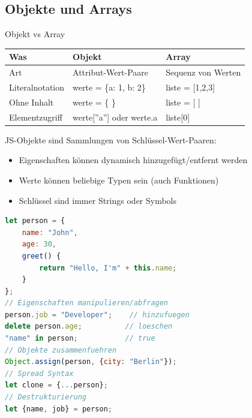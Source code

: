 \subsection{Objekte und Arrays}

\begin{theorem}{Objekt vs Array}\\
    \begin{tabular}{|l|l|l|}
        \hline
        Was & Objekt & Array \\
        \hline
        Art & Attribut-Wert-Paare & Sequenz von Werten \\
        \hline
        Literalnotation & werte = \{a: 1, b: 2\} & liste = [1,2,3] \\
        \hline
        Ohne Inhalt & werte = \{ \} & liste = [ ] \\
        \hline
        Elementzugriff & werte[''a''] oder werte.a & liste[0] \\
        \hline
    \end{tabular}
\end{theorem}

\begin{definition}{JS-Objekte}
    sind Sammlungen von Schlüssel-Wert-Paaren:
    \begin{itemize}
        \item Eigenschaften können dynamisch hinzugefügt/entfernt werden
        \item Werte können beliebige Typen sein (auch Funktionen)
        \item Schlüssel sind immer Strings oder Symbols
    \end{itemize}

\begin{lstlisting}[language=JavaScript, style=basesmol]
let person = {
    name: "John",
    age: 30,
    greet() {
        return "Hello, I'm" + this.name;
    }
};
// Eigenschaften manipulieren/abfragen
person.job = "Developer";    // hinzufuegen
delete person.age;          // loeschen
"name" in person;           // true
// Objekte zusammenfuehren
Object.assign(person, {city: "Berlin"});
// Spread Syntax
let clone = {...person};
// Destrukturierung
let {name, job} = person;
\end{lstlisting}
\end{definition}

